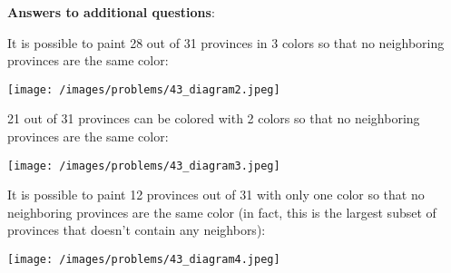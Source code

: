 \begin{solution}
\textbf{Answers to additional questions}:

It is possible to paint 28 out of 31 provinces in 3 colors so that no neighboring provinces are the same color:

\begin{center}
	\texttt{[image: /images/problems/43\_diagram2.jpeg]}
\end{center}

21 out of 31 provinces can be colored with 2 colors so that no neighboring provinces are the same color:

\begin{center}
	\texttt{[image: /images/problems/43\_diagram3.jpeg]}
\end{center}

It is possible to paint 12 provinces out of 31 with only one color so that no neighboring provinces are the same color (in fact, this is the largest subset of provinces that doesn't contain any neighbors):

\begin{center}
	\texttt{[image: /images/problems/43\_diagram4.jpeg]}
\end{center}


\end{solution}